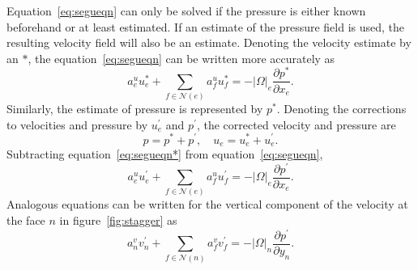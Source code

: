 Equation~\ref{eq:segueqn} can only be solved if the pressure is either known beforehand or at least estimated. If an estimate of the pressure field is used, the resulting velocity field will also be an estimate. Denoting the velocity estimate by an $\ast$, the equation~\ref{eq:segueqn} can be written more accurately as
\begin{equation}
a_e^u u_e^{\ast} + \sum_{f \in\mathcal{N}(e)} a_f^u u_f^{\ast} = -|\Omega|_e \frac{\partial p^{\ast}}{\partial x_e}.
\label{eq:segueqn*}
\end{equation}
Similarly, the estimate of pressure is represented by $p^{\ast}$. Denoting the corrections to velocities and pressure by $u_e^{\prime}$ and $p^{\prime}$, the corrected velocity and pressure are
\begin{equation}
p=p^{\ast} + p^{\prime}, \quad u_e = u_e^{\ast} + u_e^{\prime}.
\end{equation}
Subtracting equation~\ref{eq:segueqn*} from equation~\ref{eq:segueqn}, 
\begin{equation}
a_e^u u_e^{\prime} + \sum_{f \in\mathcal{N}(e)} a_f^u u_f^{\prime} = -|\Omega|_e \frac{\partial p^{\prime}}{\partial x_e}.
\label{eq:segueqncorr}
\end{equation}
Analogous equations can be written for the vertical component of the velocity at the face $n$ in figure~\ref{fig:stagger} as
\begin{equation}
a_n^v v_n^{\prime} + \sum_{f \in\mathcal{N}(n)} a_f^v v_f^{\prime} = -|\Omega|_n \frac{\partial p^{\prime}}{\partial y_n}.
\label{eq:segveqncorr}
\end{equation}

